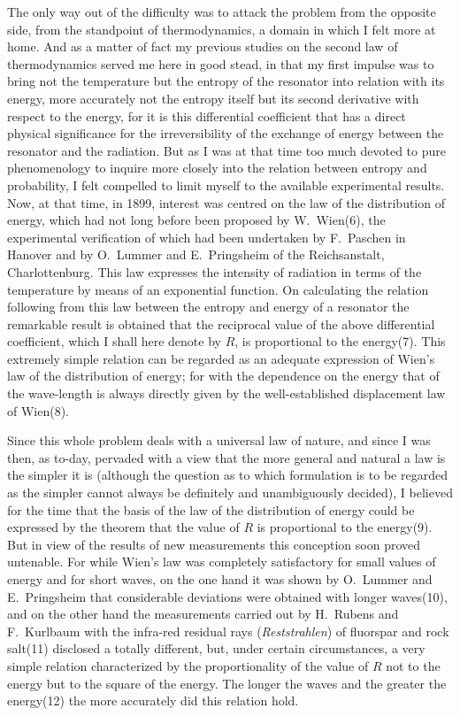 \documentclass[12pt,oneside]{book}
\begin{document}
The only way out of the difficulty was to attack the
problem from the opposite side, from the standpoint of
thermodynamics, a domain in which I felt more at home.
And as a matter of fact my previous studies on the second
law of thermodynamics served me here in good stead, in
that my first impulse was to bring not the temperature but
the entropy of the resonator into relation with its energy,
more accurately not the entropy itself but its second
derivative with respect to the energy, for it is this
differential coefficient that has a direct physical significance
for the irreversibility of the exchange of energy between
the resonator and the radiation. But as I was at that time
too much devoted to pure phenomenology to inquire more
closely into the relation between entropy and probability,
I felt compelled to limit myself to the available experimental
results. Now, at that time, in 1899, interest
was centred on the law of the distribution of energy,
which had not long before been proposed by
W.~Wien(6), the experimental verification of which had been undertaken
by F.~Paschen in Hanover and by O.~Lummer and
E.~Pringsheim of the Reichsanstalt, Charlottenburg. This
law expresses the intensity of radiation in terms of the
temperature by means of an exponential function. On
calculating the relation following from this law between
the entropy and energy of a resonator the remarkable
result is obtained that the reciprocal value of the above
differential coefficient, which I shall here denote by $R$, is
proportional to the energy(7). This extremely simple relation
can be regarded as an adequate expression of
Wien's law of the distribution of energy; for with the dependence
on the energy that of the wave-length is always
directly given by the well-established displacement law of
Wien(8).

Since this whole problem deals with a universal law of
nature, and since I was then, as to-day, pervaded with
a view that the more general and natural a law is the
simpler it is (although the question as to which formulation
is to be regarded as the simpler cannot always be definitely
and unambiguously decided), I believed for the time that
the basis of the law of the distribution of energy could
be expressed by the theorem that the value of $R$ is proportional
to the energy(9). But in view of the results of new measurements
this conception soon proved untenable.
For while Wien's law was completely satisfactory
for small values of energy and for short waves, on the one
hand it was shown by O.~Lummer and E.~Pringsheim
that considerable deviations were obtained with longer
waves(10), and on the other hand the measurements carried
out by H.~Rubens and F.~Kurlbaum with the infra-red
residual rays (\textit{Reststrahlen}) of fluorspar and rock
salt(11) disclosed a totally different, but, under certain circumstances,
a very simple relation characterized by the proportionality
of the value of $R$ not to the energy but to the
square of the energy. The longer the waves and the greater
the energy(12) the more accurately did this relation hold.
\end{document}
